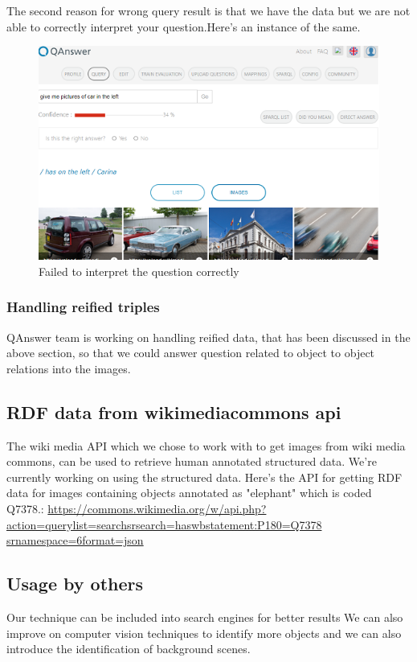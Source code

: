 \documentclass[12pt]{article}
\begin{document}
The second reason for wrong query result is that we have the data but we are not able to correctly interpret your question.Here's an instance of the same.
\newpage
\begin{figure}
\includegraphics{carina60.png} 
\caption{Failed to interpret the question correctly}
\end{figure}
\subsubsection{Handling reified triples}
QAnswer team is working on handling reified data, that has been discussed in the above section, so that we could answer
question related to object to object relations into the images.

\subsection{RDF data from wikimediacommons api}
The wiki media API which we chose to work with to get images from
wiki media commons, can be used to retrieve human
annotated structured data. We’re currently working on using the
structured data. Here’s the API for getting RDF data for images
containing objects annotated as "elephant" which is coded Q7378.:
\url{https://commons.wikimedia.org/w/api.php?
action=querylist=searchsrsearch=haswbstatement:P180=Q7378
srnamespace=6format=json}
\subsection{Usage by others}
Our technique can be included into search engines for better results
We can also improve on computer vision techniques to identify more objects and we can also introduce the identification of background scenes. 
\end{document}
